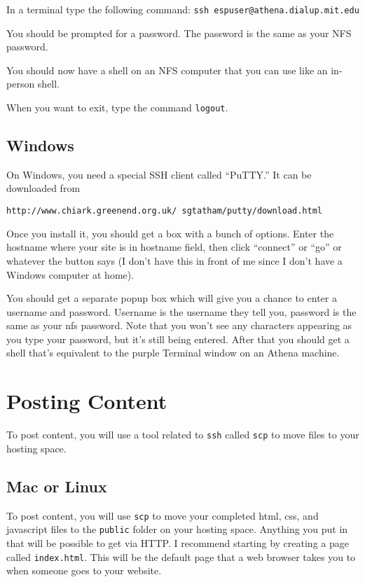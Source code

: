 \documentclass{article}
\begin{document}
In a terminal type the following command: 
\texttt{ssh espuser@athena.dialup.mit.edu}

You should be prompted for a password.  The password is the same as your NFS password.

You should now have a shell on an NFS computer that you can use like an in-person shell.  

When you want to exit, type the command \texttt{logout}.

\subsection{Windows}
On Windows, you need a special SSH client called ``PuTTY.''  It can be downloaded from 

\texttt{http://www.chiark.greenend.org.uk/~sgtatham/putty/download.html}

Once you install it, you should get a box with a bunch of options.  Enter the hostname where your site is in hostname field, then click ``connect'' or ``go'' or whatever the button says (I don't have this in front of me since I don't have a Windows computer at home).


You should get a separate popup box which will give you a chance to enter a username and password.  Username is the username they tell you, password is the same as your nfs password.  Note that you won't see any characters appearing as you type your password, but it's still being entered.  After that you should get a shell that's equivalent to the purple Terminal window on an Athena machine.


\section{Posting Content}
To post content, you will use a tool related to \texttt{ssh} called \texttt{scp} to move files to your hosting space.

\subsection{Mac or Linux}

To post content, you will use \texttt{scp} to move your completed html, css, and javascript files to the \texttt{public} folder on your hosting space.  Anything you put in that will be possible to get via HTTP.  I recommend starting by creating a page called \texttt{index.html}.  This will be the default page that a web browser takes you to when someone goes to your website.
\end{document}
